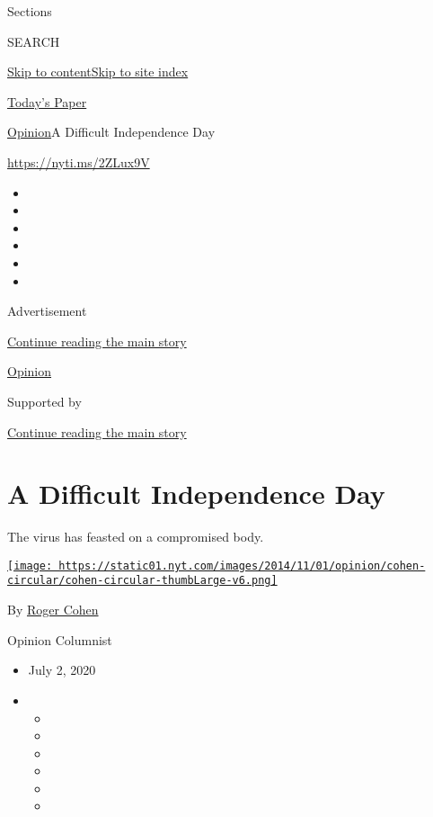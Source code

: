 Sections

SEARCH

\protect\hyperlink{site-content}{Skip to
content}\protect\hyperlink{site-index}{Skip to site index}

\href{https://myaccount.nytimes.com/auth/login?response_type=cookie\&client_id=vi}{}

\href{https://www.nytimes.com/section/todayspaper}{Today's Paper}

\href{/section/opinion}{Opinion}\textbar{}A Difficult Independence Day

\href{https://nyti.ms/2ZLux9V}{https://nyti.ms/2ZLux9V}

\begin{itemize}
\item
\item
\item
\item
\item
\item
\end{itemize}

Advertisement

\protect\hyperlink{after-top}{Continue reading the main story}

\href{/section/opinion}{Opinion}

Supported by

\protect\hyperlink{after-sponsor}{Continue reading the main story}

\hypertarget{a-difficult-independence-day}{%
\section{A Difficult Independence
Day}\label{a-difficult-independence-day}}

The virus has feasted on a compromised body.

\href{https://www.nytimes.com/by/roger-cohen}{\texttt{[image: https://static01.nyt.com/images/2014/11/01/opinion/cohen-circular/cohen-circular-thumbLarge-v6.png]}}

By \href{https://www.nytimes.com/by/roger-cohen}{Roger Cohen}

Opinion Columnist

\begin{itemize}
\item
  July 2, 2020
\item
  \begin{itemize}
  \item
  \item
  \item
  \item
  \item
  \item
  \end{itemize}
\end{itemize}

